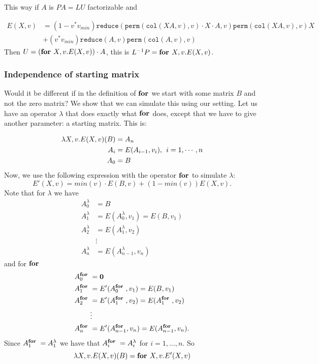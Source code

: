 This way if $A$ is $PA=LU$ factorizable and 

\begin{align*}
	E(X, v)&=(1-v^*v_{min})\texttt{reduce}(\texttt{perm}(\texttt{col}(XA,v),v) \cdot X \cdot A,v) \texttt{perm}(\texttt{col}(XA,v),v)X \\
	&+ (v^*v_{min})\texttt{reduce}(A,v)\texttt{perm}(\texttt{col}(A,v),v)
\end{align*}
Then $U=(\textbf{for } X, v.E(X,v))\cdot A$, this is $L^{-1}P=\textbf{for } X, v.E(X,v)$.

\subsubsection{Independence of starting matrix}

Would it be different if in the definition of $\textbf{for }$we start with some matrix $B$ and not the zero matrix? We show that we can simulate this using our setting. Let us have an operator $\lambda$ that does exactly what $\textbf{for }$does, except that we have to give another parameter: a starting matrix. This is:

\begin{align*}
\lambda X, v.E(X,v)(B)&=A_n \\
A_i&=E(A_{i-1}, v_{i}),\hspace{1ex}i=1,\cdots, n \\
A_0&=B
\end{align*}
Now, we use the following expression with the operator $\textbf{for }$to simulate $\lambda$: $$E'(X,v)=min(v)\cdot E(B,v)+(1-min(v))E(X,v).$$
Note that for $\lambda$ we have 
\begin{align*}
	A^{\lambda}_0&=B \\
	A^{\lambda}_1&=E(A^{\lambda}_0,v_1)=E(B,v_1) \\
	A^{\lambda}_2&=E(A^{\lambda}_1,v_2) \\
	&\vdots \\
	A^{\lambda}_n&=E(A^{\lambda}_{n-1}, v_n)
\end{align*}
and for $\textbf{for }$
\begin{align*}
	A^{\textbf{for }}_0&=\mathbf{0} \\
	A^{\textbf{for }}_1&=E'(A^{\textbf{for }}_0,v_1)=E(B,v_1) \\
	A^{\textbf{for }}_2&=E'(A^{\textbf{for }}_1,v_2)=E(A^{\textbf{for }}_1,v_2) \\
	&\vdots \\
	A^{\textbf{for }}_n&=E'(A^{\textbf{for }}_{n-1}, v_n)=E(A^{\textbf{for }}_{n-1}, v_n).
\end{align*}
Since $A^{\textbf{for }}_1=A^{\lambda}_1$ we have that $A^{\textbf{for }}_i=A^{\lambda}_i$ for $i=1,\ldots,n$. So $$\lambda X, v.E(X,v)(B)=\textbf{for } X, v.E'(X,v)$$